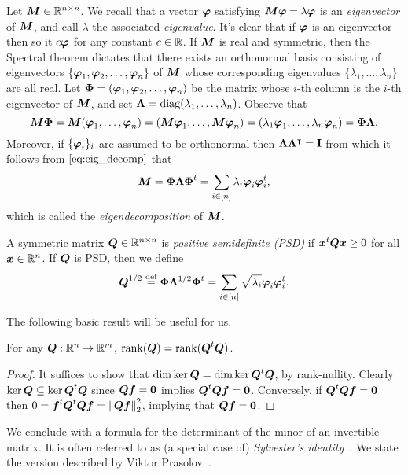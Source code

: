 Let ${\vb*{M}}\in\mathbb{R}^{n\times n}$. We recall that a vector $\vb*{\varphi}$ satisfying ${\vb*{M}}\vb*{\varphi}=\lambda\vb*{\varphi}$ is an \emph{eigenvector} of ${\vb*{M}}$, and call $\lambda$ the associated \emph{eigenvalue}. It's clear that if $\vb*{\varphi}$ is an eigenvector then so it $c\vb*{\varphi}$ for any constant $c\in \mathbb{R}$. If ${\vb*{M}}$ is real and symmetric, then the Spectral theorem dictates that there exists an orthonormal basis consisting of eigenvectors $\{\vb*{\varphi}_1,\vb*{\varphi}_2,\dots,\vb*{\varphi}_n\}$ of ${\vb*{M}}$ whose corresponding eigenvalues $\{\lambda_1,\dots,\lambda_n\}$ are all real. Let $\boldsymbol{\Phi}=(\vb*{\varphi}_1,\vb*{\varphi}_2,\dots,\vb*{\varphi}_n)$ be the matrix whose $i$-th column is the $i$-th eigenvector of ${\vb*{M}}$, and set $\vb{\Lambda}=\text{diag}(\lambda_1,\dots,\lambda_n)$. Observe that 
\begin{equation}
\label{eq:eig_decomp}
{\vb*{M}}\boldsymbol{\Phi}={\vb*{M}}(\vb*{\varphi}_1,\dots,\vb*{\varphi}_n)=({\vb*{M}}\vb*{\varphi}_1,\dots,{\vb*{M}}\vb*{\varphi}_n)=(\lambda_1\vb*{\varphi}_1,\dots,\lambda_n\vb*{\varphi}_n)=\boldsymbol{\Phi}\vb{\Lambda}.
\end{equation}
Moreover, if $\{\vb*{\varphi}_i\}_i$ are assumed to be orthonormal then $\vb{\Lambda}\vb{\Lambda}^\intercal=\vb{I}$ from which it follows from $\eqref{eq:eig_decomp}$ that \begin{equation}
    \label{eq:eig_decomp2}
    {\vb*{M}}=\boldsymbol{\Phi}\vb{\Lambda}\boldsymbol{\Phi}^t = \sum_{i\in[n]}\lambda_i\vb*{\varphi}_i\vb*{\varphi}_i^t,
\end{equation}
which is called the \emph{eigendecomposition} of ${\vb*{M}}$. 

A symmetric matrix $\vb*{Q}\in\mathbb{R}^{n\times n}$ is \emph{positive semidefinite (PSD)} if $\vb*{x}^t\vb*{Q}\vb*{x} \geq 0$ for all $\vb*{x}\in\mathbb{R}^n$. If $\vb*{Q}$ is PSD, then we define 
\begin{equation*}
    \vb*{Q}^{1/2} \overset{\text{def}}{=} \boldsymbol{\Phi}\vb{\Lambda}^{1/2}\boldsymbol{\Phi}^t = \sum_{i\in[n]}\sqrt{\lambda_i}\vb*{\varphi}_i\vb*{\varphi}_i^t.
\end{equation*}

The following basic result will be useful for us. 

\begin{lemma}
	\label{lem:rank(QtQ)}
	For any $\vb*{Q}:\mathbb{R}^n\to\mathbb{R}^m$, $\rank(\vb*{Q}) = \rank(\vb*{Q}^t\vb*{Q})$. 
\end{lemma}
\begin{proof}
	It suffices to show that $\dim\ker\vb*{Q} = \dim\ker\vb*{Q}^t \vb*{Q}$, by rank-nullity. Clearly $\ker\vb*{Q} \subseteq \ker\vb*{Q}^t\vb*{Q}$ since $\vb*{Q}\vb*{f}=\vb{0}$ implies $\vb*{Q}^t\vb*{Q}\vb*{f}=\vb{0}$. Conversely, if $\vb*{Q}^t\vb*{Q}\vb*{f}=\vb{0}$ then $0=\vb*{f}^t \vb*{Q}^t \vb*{Q}\vb*{f} = \norm{\vb*{Q}\vb*{f}}_2^2$, implying that $\vb*{Q}\vb*{f}=\vb{0}$.  
\end{proof}

We conclude with a formula for  the determinant of the minor of an invertible matrix.  It is often referred to as (a special  case of) \emph{Sylvester's identity}~\cite{sylvester1851xxxvii}. We state the version described by Viktor Prasolov~\cite{prasolov1994problems}. 

